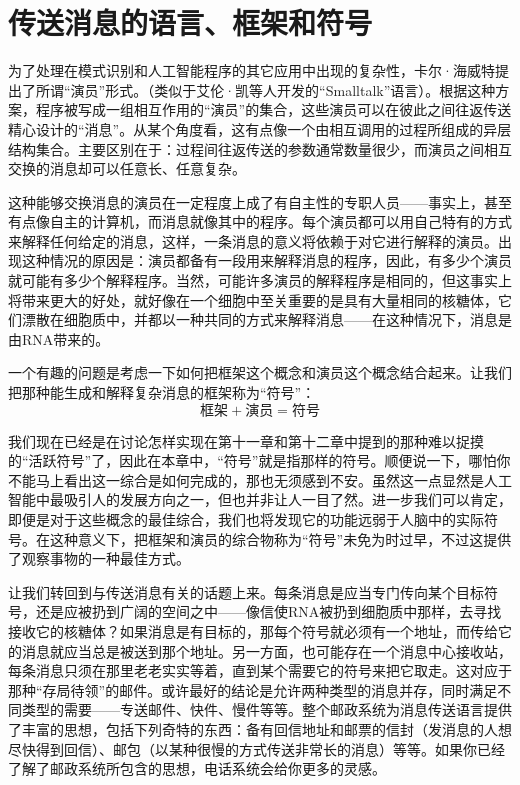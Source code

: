 \section{传送消息的语言、框架和符号}

为了处理在模式识别和人工智能程序的其它应用中出现的复杂性，卡尔·海威特提出了所谓“演员”形式。（类似于艾伦·凯等人开发的“Smalltalk”语言）。根据这种方案，程序被写成一组相互作用的“演员”的集合，这些演员可以在彼此之间往返传送精心设计的“消息”。从某个角度看，这有点像一个由相互调用的过程所组成的异层结构集合。主要区别在于：过程间往返传送的参数通常数量很少，而演员之间相互交换的消息却可以任意长、任意复杂。

这种能够交换消息的演员在一定程度上成了有自主性的专职人员——事实上，甚至有点像自主的计算机，而消息就像其中的程序。每个演员都可以用自己特有的方式来解释任何给定的消息，这样，一条消息的意义将依赖于对它进行解释的演员。出现这种情况的原因是：演员都备有一段用来解释消息的程序，因此，有多少个演员就可能有多少个解释程序。当然，可能许多演员的解释程序是相同的，但这事实上将带来更大的好处，就好像在一个细胞中至关重要的是具有大量相同的核糖体，它们漂散在细胞质中，并都以一种共同的方式来解释消息——在这种情况下，消息是由RNA带来的。

一个有趣的问题是考虑一下如何把框架这个概念和演员这个概念结合起来。让我们把那种能生成和解释复杂消息的框架称为“符号”：
\[
\text{框架}+\text{演员}=\text{符号}
\]

我们现在已经是在讨论怎样实现在第十一章和第十二章中提到的那种难以捉摸的“活跃符号”了，因此在本章中，“符号”就是指那样的符号。顺便说一下，哪怕你不能马上看出这一综合是如何完成的，那也无须感到不安。虽然这一点显然是人工智能中最吸引人的发展方向之一，但也并非让人一目了然。进一步我们可以肯定，即便是对于这些概念的最佳综合，我们也将发现它的功能远弱于人脑中的实际符号。在这种意义下，把框架和演员的综合物称为“符号”未免为时过早，不过这提供了观察事物的一种最佳方式。

让我们转回到与传送消息有关的话题上来。每条消息是应当专门传向某个目标符号，还是应被扔到广阔的空间之中——像信使RNA被扔到细胞质中那样，去寻找接收它的核糖体？如果消息是有目标的，那每个符号就必须有一个地址，而传给它的消息就应当总是被送到那个地址。另一方面，也可能存在一个消息中心接收站，每条消息只须在那里老老实实等着，直到某个需要它的符号来把它取走。这对应于那种“存局待领”的邮件。或许最好的结论是允许两种类型的消息并存，同时满足不同类型的需要——专送邮件、快件、慢件等等。整个邮政系统为消息传送语言提供了丰富的思想，包括下列奇特的东西：备有回信地址和邮票的信封（发消息的人想尽快得到回信）、邮包（以某种很慢的方式传送非常长的消息）等等。如果你已经了解了邮政系统所包含的思想，电话系统会给你更多的灵感。


